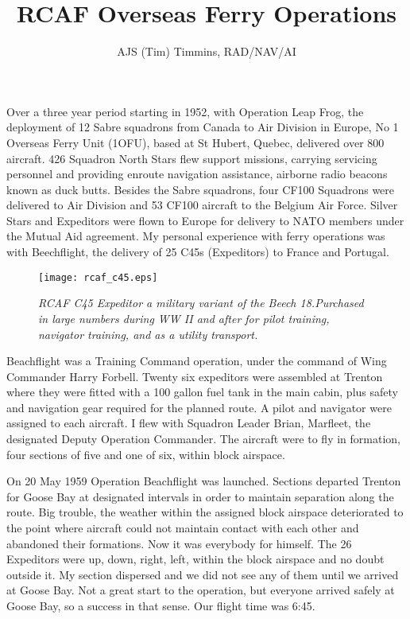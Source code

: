 %


\title{RCAF Overseas Ferry Operations}
\author{AJS (Tim) Timmins, RAD/NAV/AI}

\maketitle

Over a three year period starting in 1952, with Operation Leap Frog,
the deployment of 12 Sabre squadrons from Canada to Air Division in
Europe, No 1 Overseas Ferry Unit (1OFU), based at St Hubert, Quebec,
delivered over 800 aircraft. 426 Squadron North Stars flew support
missions, carrying servicing personnel and providing enroute
navigation assistance, airborne radio beacons known as duck
butts. Besides the Sabre squadrons, four CF100 Squadrons were
delivered to Air Division and 53 CF100 aircraft to the Belgium Air
Force. Silver Stars and Expeditors were flown to Europe for delivery
to NATO members under the Mutual Aid agreement. My personal experience
with ferry operations was with Beechflight, the delivery of 25 C45s
(Expeditors) to France and Portugal.

\begin{figure}[htbp]
   \vspace{2em}
   \centering
   \texttt{[image: rcaf\_c45.eps]}
   \caption*{\small \em RCAF C45 Expeditor a military variant of the Beech 18.Purchased in large numbers during WW II and after for pilot training, navigator training, and as a utility transport.}
   \label{fig:rcaf_c45}
\end{figure}

Beachflight was a Training Command operation, under the command of
Wing Commander Harry Forbell. Twenty six expeditors were assembled at
Trenton where they were fitted with a 100 gallon fuel tank in the main
cabin, plus safety and navigation gear required for the planned
route. A pilot and navigator were assigned to each aircraft. I flew
with Squadron Leader Brian, Marfleet, the designated Deputy Operation
Commander. The aircraft were to fly in formation, four sections of
five and one of six, within block airspace. 

On 20 May 1959 Operation Beachflight was launched. Sections departed
Trenton for Goose Bay at designated intervals in order to maintain
separation along the route. Big trouble, the weather within the
assigned block airspace deteriorated to the point where aircraft could
not maintain contact with each other and abandoned their
formations. Now it was everybody for himself. The 26 Expeditors were
up, down, right, left, within the block airspace and no doubt outside
it. My section dispersed and we did not see any of them until we
arrived at Goose Bay. Not a great start to the operation, but everyone
arrived safely at Goose Bay, so a success in that sense. Our flight
time was 6:45.

